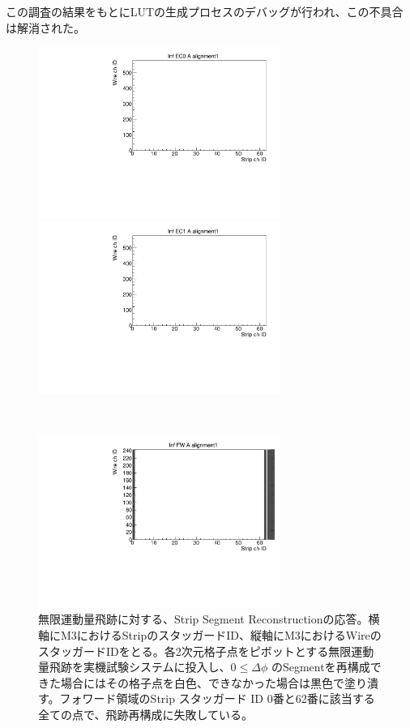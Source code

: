 この調査の結果をもとにLUTの生成プロセスのデバッグが行われ、この不具合は解消された。
\begin{figure}
    \begin{minipage}[b]{.5\linewidth}
        \centering
        \includegraphics[height=5.6cm]{fig/Test/B_InfEC0_strip.pdf}
    \end{minipage}
    \begin{minipage}[b]{.5\linewidth}
        \centering
        \includegraphics[height=5.6cm]{fig/Test/B_InfEC1_strip.pdf}
    \end{minipage}\\
    \begin{minipage}[b]{\linewidth}
        \centering
        \includegraphics[height=5.6cm]{fig/Test/B_InfFW_strip.pdf}
    \end{minipage}
    \caption[無限運動量飛跡に対する、Strip Segment Reconstructionの応答]{無限運動量飛跡に対する、Strip Segment Reconstructionの応答。横軸にM3におけるStripのスタッガードID、縦軸にM3におけるWireのスタッガードIDをとる。各2次元格子点をピボットとする無限運動量飛跡を実機試験システムに投入し、$0 \leq \Delta\phi$ のSegmentを再構成できた場合にはその格子点を白色、できなかった場合は黒色で塗り潰す。フォワード領域のStrip スタッガード ID 0番と62番に該当する全ての点で、飛跡再構成に失敗している。}
    \label{Inf_B_Strip}
\end{figure}

